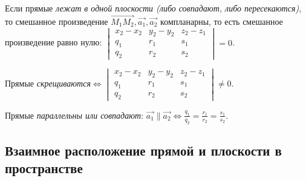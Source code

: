 \documentclass[a4paper]{article}
\begin{document}
    Если прямые \textit{лежат в одной плоскости (либо совпадают, либо пересекаются)}, то смешанное произведение $\overrightarrow{M_1M_2}, \vec{a_1}, \vec{a_2}$ компланарны, то есть смешанное произведение равно нулю: $\displaystyle \begin{vmatrix}
                                                                                                                                                                                                                                           x_2-x_2 & y_2-y_2 & z_2-z_1 \\
                                                                                                                                                                                                                                           q_1     & r_1     & s_1     \\
                                                                                                                                                                                                                                           q_2     & r_2     & s_2
    \end{vmatrix} = 0$.

    Прямые \textit{скрещиваются}$\displaystyle \Leftrightarrow \begin{vmatrix}
                                                                   x_2-x_2 & y_2-y_2 & z_2-z_1 \\
                                                                   q_1     & r_1     & s_1     \\
                                                                   q_2     & r_2     & s_2
    \end{vmatrix} \neq 0$.

    Прямые \textit{параллельны или совпадают}: $\displaystyle \vec{a_1} \parallel \vec{a_2} \Leftrightarrow \frac{q_1}{q_2} = \frac{r_1}{r_2} = \frac{s_1}{s_2}$.

    \newpage \begin{center}
                 \begin{Large}
                 \end{Large}
    \end{center}
    \subsection*{Взаимное расположение прямой и плоскости в пространстве}
\end{document}
